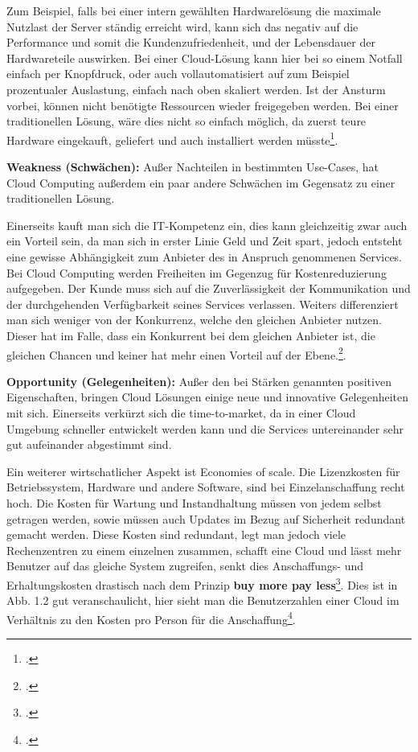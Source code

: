 Zum Beispiel, falls bei einer intern gewählten Hardwarelösung die maximale Nutzlast der Server ständig erreicht wird, kann sich das negativ auf die Performance und somit die Kundenzufriedenheit, und der Lebensdauer der 
Hardwareteile auswirken. Bei einer Cloud-Lösung kann hier bei so einem Notfall einfach per Knopfdruck, oder auch vollautomatisiert auf zum Beispiel prozentualer Auslastung, einfach nach oben skaliert werden. Ist der Ansturm vorbei, können nicht benötigte Ressourcen wieder freigegeben werden.
Bei einer traditionellen Lösung, wäre dies nicht so einfach möglich, da zuerst teure Hardware eingekauft, geliefert und auch installiert werden müsste\footcite{Lehrunterlagen-HTL-cloud}.

\textbf{Weakness (Schwächen):} Außer Nachteilen in bestimmten Use-Cases, hat Cloud Computing außerdem ein paar andere Schwächen im Gegensatz zu einer traditionellen Lösung.

Einerseits kauft man sich die IT-Kompetenz ein, dies kann gleichzeitig zwar auch ein Vorteil sein, da man sich in erster 
Linie Geld und Zeit spart, jedoch entsteht eine gewisse Abhängigkeit zum Anbieter des in Anspruch genommenen Services. Bei Cloud Computing werden Freiheiten im Gegenzug für Kostenreduzierung aufgegeben. Der Kunde muss sich auf die Zuverlässigkeit der
Kommunikation und der durchgehenden Verfügbarkeit seines Services verlassen. Weiters differenziert man sich weniger von der Konkurrenz, welche den gleichen Anbieter nutzen. Dieser hat im Falle, dass ein Konkurrent bei dem gleichen Anbieter ist, die gleichen Chancen und keiner hat mehr einen Vorteil auf der Ebene.\footcite{Lehrunterlagen-HTL-cloud}.

\textbf{Opportunity (Gelegenheiten):} Außer den bei Stärken genannten positiven Eigenschaften, bringen Cloud Lösungen einige neue und innovative Gelegenheiten mit sich. Einerseits verkürzt sich die time-to-market, da in einer Cloud Umgebung schneller entwickelt werden kann und die Services
untereinander sehr gut aufeinander abgestimmt sind.

Ein weiterer wirtschatlicher Aspekt ist Economies of scale. Die Lizenzkosten für Betriebssystem, Hardware und andere Software, sind bei Einzelanschaffung recht hoch.
Die Kosten für Wartung und Instandhaltung müssen von jedem selbst getragen werden, sowie müssen auch Updates im Bezug auf Sicherheit redundant gemacht werden. Diese Kosten sind redundant, legt man jedoch viele Rechenzentren zu einem einzelnen zusammen, schafft eine Cloud und lässt mehr Benutzer auf das gleiche System zugreifen, senkt
dies Anschaffungs- und Erhaltungskosten drastisch nach dem Prinzip \textbf{buy more pay less}\footcite{eos}. Dies ist in Abb. 1.2 gut veranschaulicht, hier sieht man die Benutzerzahlen einer Cloud im Verhältnis zu den Kosten pro Person für die Anschaffung\footcite{Lehrunterlagen-HTL-cloud}.


